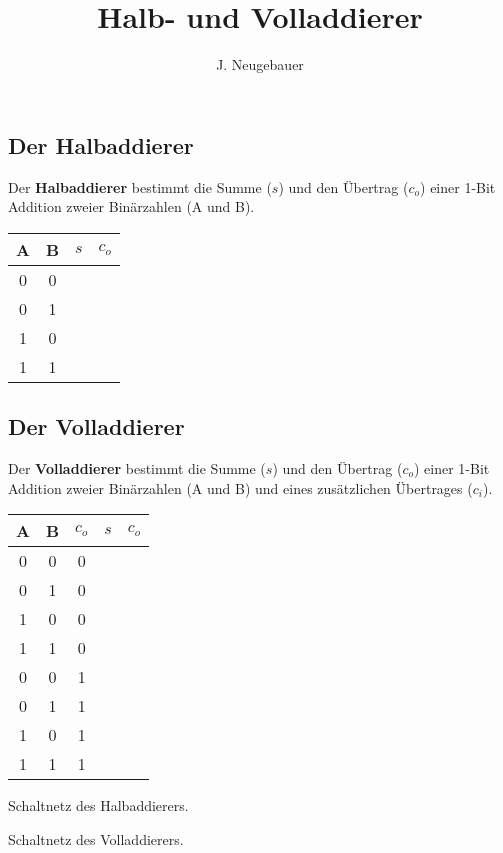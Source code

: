 \documentclass[10pt, a4paper]{scrartcl}
\author{J. Neugebauer}
\title{Halb- und Volladdierer}
\date{\Heute}
\begin{document}
\ReiheTitel

\begin{multicols}{2}
\subsection*{Der Halbaddierer}

Der \textbf{Halbaddierer} bestimmt die Summe ($s$) und den Übertrag ($c_o$) einer 1-Bit Addition zweier Binärzahlen (A und B).

\begin{center}
\begin{tabular}{c|c|c|c}\texttt\small
	A & B & $s$ & $c_o$\\\hline
	0 & 0 & & \\
	0 & 1 & & \\
	1 & 0 & & \\
	1 & 1 & & \\
\end{tabular}
\end{center}

\vspace*{1cm}

\columnbreak

\subsection*{Der Volladdierer}

Der \textbf{Volladdierer} bestimmt die Summe ($s$) und den Übertrag ($c_o$) einer 1-Bit Addition zweier Binärzahlen (A und B) und eines zusätzlichen Übertrages ($c_i$).

\begin{center}
\begin{tabular}{c|c|c|c|c}\texttt\small
	A & B & $c_o$ & $s$ & $c_o$\\\hline
	0 & 0 & 0 & & \\
	0 & 1 & 0 & & \\
	1 & 0 & 0 & & \\
	1 & 1 & 0 & & \\
	0 & 0 & 1 & & \\
	0 & 1 & 1 & & \\
	1 & 0 & 1 & & \\
	1 & 1 & 1 & & \\
\end{tabular}
\end{center}
\end{multicols}

\begin{rahmen}\centering
Schaltnetz des Halbaddierers.
\vspace{5cm}
\end{rahmen}
\begin{rahmen}\centering
Schaltnetz des Volladdierers.
\vspace{5cm}
\end{rahmen}
\end{document}
